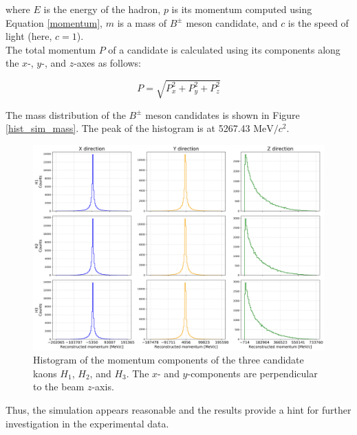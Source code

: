     where \(E\) is the energy of the hadron, \(p\) is its momentum computed using Equation \ref{momentum}, \(m\) is a mass of \(B^\pm\) meson candidate, and \(c\) is the speed of light (here, \(c = 1\)).
    \\
    
    The total momentum \( P \) of a candidate is calculated using its components along the \( x \)-, \( y \)-, and \( z \)-axes as follows:

    \begin{equation}
    P = \sqrt{P_x^2 + P_y^2 + P_z^2}
    \label{momentum}
    \end{equation}
  
     The mass distribution of the \(B^\pm\) meson candidates is shown in Figure \ref{hist_sim_mass}. The peak of the histogram is at 5267.43 \(\text{MeV/$c^{2}$}\).
 
    
    \begin{figure}[H]
        \centering
        \includegraphics[scale=0.1]{Figure/hist_sim_p.png}
        \caption{Histogram of the momentum components of the three candidate kaons \(H_1\), \(H_2\), and \(H_3\). The \(x\)- and \(y\)-components are perpendicular to the beam \(z\)-axis.}
        \label{hist_sim_p}
    \end{figure}

    
    Thus, the simulation appears reasonable and the results provide a hint for further investigation in the experimental data.

